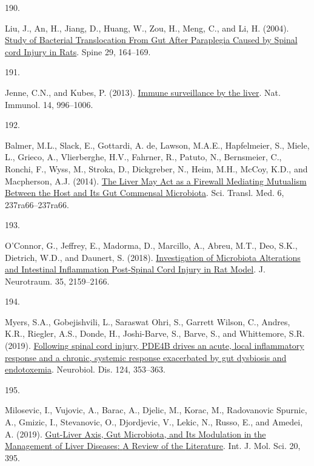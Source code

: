 \documentclass[
]{article}
\newlength{\cslhangindent}
\newlength{\csllabelwidth}
\newlength{\cslentryspacingunit} %
\newenvironment{CSLReferences}[2] %
 {%
  \setlength{\parindent}{0pt}
  \ifodd #1
  \let\oldpar\par
  \def\par{\hangindent=\cslhangindent\oldpar}
  \fi
  \setlength{\parskip}{#2\cslentryspacingunit}
 }%
 {}
\newcommand{\CSLLeftMargin}[1]{\parbox[t]{\csllabelwidth}{#1}}
\newcommand{\CSLRightInline}[1]{\parbox[t]{\linewidth - \csllabelwidth}{#1}\break}
\begin{document}
\begin{CSLReferences}{0}{0}
\leavevmode{}%
\CSLLeftMargin{190. }
\CSLRightInline{Liu, J., An, H., Jiang, D., Huang, W., Zou, H., Meng, C., and Li, H. (2004). \href{https://doi.org/10.1097/01.BRS.0000107234.74249.CD}{Study of {Bacterial Translocation From Gut After Paraplegia Caused} by {Spinal} cord {Injury} in {Rats}}. Spine 29, 164--169.}

\leavevmode{}%
\CSLLeftMargin{191. }
\CSLRightInline{Jenne, C.N., and Kubes, P. (2013). \href{https://doi.org/10.1038/ni.2691}{Immune surveillance by the liver}. Nat. Immunol. 14, 996--1006.}

\leavevmode{}%
\CSLLeftMargin{192. }
\CSLRightInline{Balmer, M.L., Slack, E., Gottardi, A. de, Lawson, M.A.E., Hapfelmeier, S., Miele, L., Grieco, A., Vlierberghe, H.V., Fahrner, R., Patuto, N., Bernsmeier, C., Ronchi, F., Wyss, M., Stroka, D., Dickgreber, N., Heim, M.H., McCoy, K.D., and Macpherson, A.J. (2014). \href{https://doi.org/10.1126/scitranslmed.3008618}{The {Liver May Act} as a {Firewall Mediating Mutualism Between} the {Host} and {Its Gut Commensal Microbiota}}. Sci. Transl. Med. 6, 237ra66--237ra66.}

\leavevmode{}%
\CSLLeftMargin{193. }
\CSLRightInline{O'Connor, G., Jeffrey, E., Madorma, D., Marcillo, A., Abreu, M.T., Deo, S.K., Dietrich, W.D., and Daunert, S. (2018). \href{https://doi.org/10.1089/neu.2017.5349}{Investigation of {Microbiota Alterations} and {Intestinal Inflammation Post-Spinal Cord Injury} in {Rat Model}}. J. Neurotraum. 35, 2159--2166.}

\leavevmode{}%
\CSLLeftMargin{194. }
\CSLRightInline{Myers, S.A., Gobejishvili, L., Saraswat Ohri, S., Garrett Wilson, C., Andres, K.R., Riegler, A.S., Donde, H., Joshi-Barve, S., Barve, S., and Whittemore, S.R. (2019). \href{https://doi.org/10.1016/j.nbd.2018.12.008}{Following spinal cord injury, {PDE4B} drives an acute, local inflammatory response and a chronic, systemic response exacerbated by gut dysbiosis and endotoxemia}. Neurobiol. Dis. 124, 353--363.}

\leavevmode{}%
\CSLLeftMargin{195. }
\CSLRightInline{Milosevic, I., Vujovic, A., Barac, A., Djelic, M., Korac, M., Radovanovic Spurnic, A., Gmizic, I., Stevanovic, O., Djordjevic, V., Lekic, N., Russo, E., and Amedei, A. (2019). \href{https://doi.org/10.3390/ijms20020395}{Gut-{Liver Axis}, {Gut Microbiota}, and {Its Modulation} in the {Management} of {Liver Diseases}: {A Review} of the {Literature}}. Int. J. Mol. Sci. 20, 395.}


\end{CSLReferences}
\end{document}
